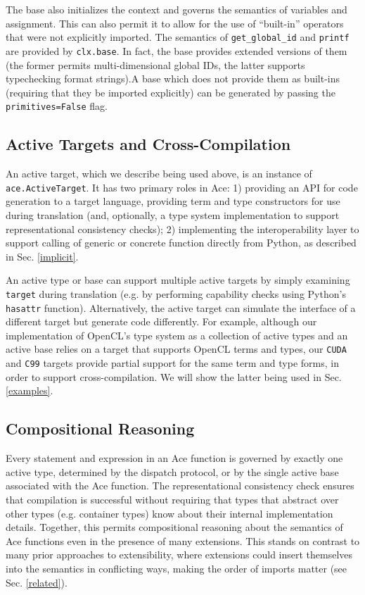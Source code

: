 \documentclass[9pt,preprint]{sigplanconf}
\begin{document}
The base also initializes the context and governs the semantics of variables and assignment. This can also permit it to allow for the use of ``built-in'' operators that were not explicitly imported. The semantics of \verb|get_global_id| and \verb|printf| are provided by \verb|clx.base|. In fact, the base provides extended versions of them (the former permits multi-dimensional global IDs, the latter supports typechecking format strings).A base which does not provide them as built-ins (requiring that they be imported explicitly) can be generated by passing the \verb|primitives=False| flag.

\subsection{Active Targets and Cross-Compilation}\label{atargets}
An active target, which we describe being used above, is an instance of \verb|ace.ActiveTarget|. It has two primary roles in Ace: 1) providing an API for code generation to a target language, providing term and type constructors for use during translation (and, optionally, a type system implementation to support representational consistency checks); 2) implementing the interoperability layer to support calling of  generic or concrete function directly from Python, as described in Sec. \ref{implicit}.

An active type or base can support multiple active targets by simply examining \verb|target| during translation (e.g. by performing capability checks using Python's \verb|hasattr| function). Alternatively, the active target can simulate the interface of a different target but generate code differently. For example, although our implementation of OpenCL's type system as a collection of active types and an active base relies on a target that supports OpenCL terms and types, our \verb|CUDA| and \verb|C99| targets provide partial support for the same term and type forms, in order to support cross-compilation. We will show the latter being used in Sec. \ref{examples}. 


\subsection{Compositional Reasoning}\label{safety}
Every statement and expression in an Ace function is governed by exactly one active type, determined by the dispatch protocol, or by the single active base associated with the Ace function. The representational consistency check ensures that compilation is successful without requiring that types that abstract over other types (e.g. container types) know about their internal implementation details. Together, this permits compositional reasoning about the semantics of Ace functions even in the presence of many extensions. This stands on contrast to many prior approaches to extensibility, where extensions could insert themselves into the semantics in conflicting ways, making the order of imports matter (see Sec. \ref{related}). 
\end{document}
